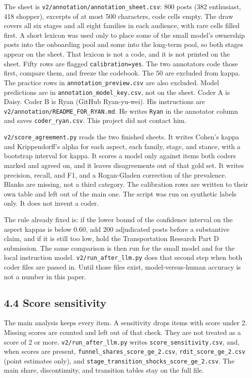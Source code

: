 \documentclass[11pt]{article}
\begin{document}
The sheet is \texttt{v2/annotation/annotation\_sheet.csv}: 800 posts (382 enthusiast, 418 shopper), excerpts of at most 500 characters, code cells empty. The draw covers all six stages and all eight families in each audience, with rare cells filled first. A short lexicon was used only to place some of the small model's ownership posts into the onboarding pool and some into the long-term pool, so both stages appear on the sheet. That lexicon is not a code, and it is not printed on the sheet. Fifty rows are flagged \texttt{calibration=yes}. The two annotators code those first, compare them, and freeze the codebook. The 50 are excluded from kappa. The practice rows in \texttt{annotation\_preview.csv} are also excluded. Model predictions are in \texttt{annotation\_model\_key.csv}, not on the sheet. Coder A is Daisy. Coder B is Ryan (GitHub Ryan-yu-wei). His instructions are \texttt{v2/annotation/README\_FOR\_RYAN.md}. He writes \texttt{Ryan} in the annotator column and saves \texttt{coder\_ryan.csv}. This project did not contact him.


\texttt{v2/score\_agreement.py} reads the two finished sheets. It writes Cohen's kappa and Krippendorff's alpha for each aspect, each family, stage, and stance, with a bootstrap interval for kappa. It scores a model only against items both coders marked and agreed on, and it leaves disagreements out of that gold set. It writes precision, recall, and F1, and a Rogan-Gladen correction of the prevalence. Blanks are missing, not a third category. The calibration rows are written to their own table and left out of the main one. The script was run on synthetic labels only. It does not invent a coder.


The rule already fixed is: if the lower bound of the confidence interval on the aspect kappas is below 0.60, add 200 adjudicated posts before a substantive claim, and if it is still too low, hold the Transportation Research Part D submission. The same comparison is then run for the small model and for the local instruction model. \texttt{v2/run\_after\_llm.py} does that second step when both coder files are passed in. Until those files exist, model-versus-human accuracy is not a number in this paper.


\subsection{4.4 Score sensitivity}

The main analysis keeps every item. A sensitivity drops items with score under 2. Missing scores are counted and left out of that check. They are not treated as a score of 2 or more. \texttt{v2/run\_after\_llm.py} writes \texttt{score\_sensitivity.csv}, and, when scores are present, \texttt{funnel\_shares\_score\_ge\_2.csv}, \texttt{rdit\_score\_ge\_2.csv} (point estimates only), and \texttt{stage\_transition\_shocks\_score\_ge\_2.csv}. The main share, discontinuity, and transition tables stay on the full file.
\end{document}
